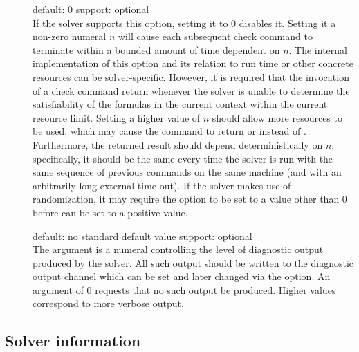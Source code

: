 \begin{description}
\item[] 
\quad default: $0$
\quad support: optional
\\
If the solver supports this option, setting it to $0$ disables it.
Setting it a non-zero numeral $n$ will cause each subsequent check command 
to terminate within a bounded amount of time dependent on $n$.
The internal implementation of this option and its relation to run time or 
other concrete resources can be solver-specific.
However, it is required that the invocation of a check command return 
 whenever the solver is unable to determine the satisfiability 
of the formulas in the current context within the current resource limit. 
Setting a higher value of $n$ should allow more resources to be used, 
which may cause the command to return  or  instead 
of . 
Furthermore, the returned result should depend deterministically on $n$;
specifically, it should be the same every time the solver is run 
with the same sequence of previous commands on the same machine 
(and with an arbitrarily long external time out). 
If the solver makes use of randomization, it may require 
the  option to be set to a value other than $0$ 
before  can be set to a positive value.

\item[] 
\quad default: no standard default value
\quad support: optional
\\
The argument is a numeral controlling the level of diagnostic output produced
by the solver.  
All such output should be written to the diagnostic output channel
which can be set and later changed via the  option.  
An argument of $0$ requests that no such output be produced.  
Higher values correspond to more verbose output.
\end{description}

\subsection{Solver information}   \label{sec:get-info}

